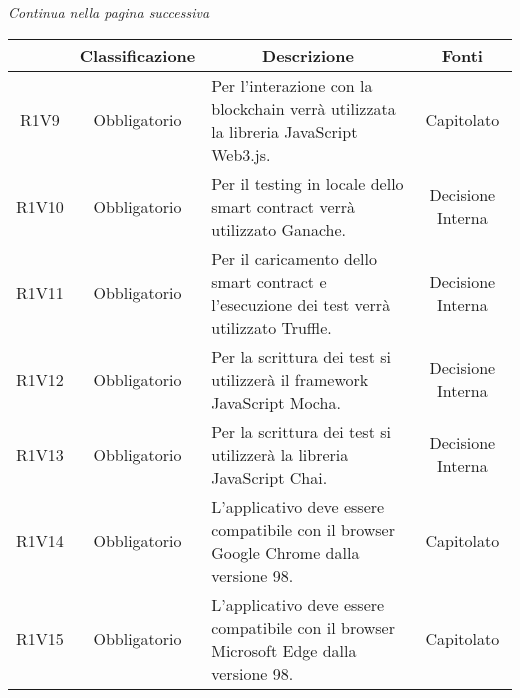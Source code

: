 \begin{center}
    \textit{\small Continua nella pagina successiva}
\end{center}
\begin{table}[H]
    \centering
    \renewcommand{\arraystretch}{1.8}
    \begin{tabular}{c | c | p{6cm} | c}
        \rowcolor[HTML]{125E28}
        \multicolumn{1}{c}{\color[HTML]{FFFFFF} \textbf{Codice}}          &
        \multicolumn{1}{c}{\color[HTML]{FFFFFF} \textbf{Classificazione}} &
        \multicolumn{1}{c}{\color[HTML]{FFFFFF} \textbf{Descrizione}}     &
        \multicolumn{1}{c}{\color[HTML]{FFFFFF} \textbf{Fonti}}                                                                                                                                                                   \\
        \hline
        R1V9                                                              & Obbligatorio & Per l'interazione con la blockchain\glo{} verrà utilizzata la libreria JavaScript\glo{} Web3.js\glo{}.        & Capitolato               \\
        R1V10                                                             & Obbligatorio & Per il testing in locale dello smart contract\glo{} verrà utilizzato Ganache\glo{}.                           & Decisione Interna        \\
        R1V11                                                             & Obbligatorio & Per il caricamento dello smart contract\glo{} e l'esecuzione dei test verrà utilizzato Truffle\glo{}.         & Decisione Interna        \\
        R1V12                                                             & Obbligatorio & Per la scrittura dei test si utilizzerà il framework\glo{} JavaScript\glo{} Mocha\glo{}.                      & Decisione Interna        \\
        R1V13                                                             & Obbligatorio & Per la scrittura dei test si utilizzerà la libreria JavaScript\glo{} Chai\glo{}.                              & Decisione Interna        \\
        R1V14                                                             & Obbligatorio & L'applicativo deve essere compatibile con il browser Google Chrome\glo{} dalla versione 98.  & Capitolato \\
        R1V15                                                             & Obbligatorio & L'applicativo deve essere compatibile con il browser Microsoft Edge\glo{} dalla versione 98. & Capitolato \\

\end{tabular}
\end{table}
